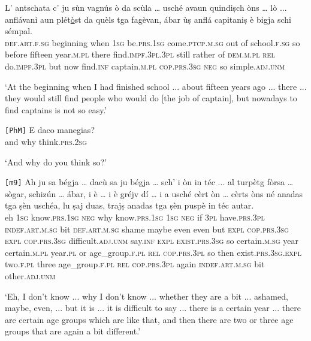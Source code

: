 \begin{linenumbers}
	\gll L’ antschata c’ ju sùn vagnús ò da scùla … usché avaun quindiṣch òns … lò ... anflávani aun plét\underline{ò}st da quèls tga fagèvan, ábar ùṣ anflá capitaniṣ è bigja schi sémpal.   \\
\textsc{def.art.f.sg} beginning when \textsc{1sg} be.\textsc{prs.1sg} come.\textsc{ptcp.m.sg} out of school.\textsc{f.sg} {} so before fifteen year.\textsc{m.pl} {} there {} find.\textsc{impf.3pl.3pl} still rather of \textsc{dem.m.pl} \textsc{rel} do.\textsc{impf.3pl} but now find.\textsc{inf} captain.\textsc{m.pl} \textsc{cop.prs.3sg} \textsc{neg} so simple.\textsc{adj.unm}\\
\end{linenumbers}
\medskip
\glt `At the beginning when I had finished school ... about fifteen years ago ... there ... they would still find people who would do [the job of captain], but nowadays to find captains is not so easy.'
\medskip

\begin{linenumbers}
	\gll  \texttt{[PhM]} E daco manegias?\\
	{} and why think.\textsc{prs.2sg}\\
\end{linenumbers}
\medskip
\glt `And why do you think so?'

\begin{linenumbers}
	\gll \texttt{[m9]} Ah ju sa bégja … dacù sa ju bégja … sch’ i òn in téc ... al turpètg fòrsa … sògar, schizún\footnotemark{} … ábar, i è … i è gréjv dí … i a usché cèrt òn … cèrts òns né anadas tga ṣèn uschéa, lu ṣaj duas, trajṣ anadas tga ṣèn puspè in téc autar.\\
{} eh \textsc{1sg} know.\textsc{prs.1sg} \textsc{neg} {} why know.\textsc{prs.1sg} \textsc{1sg} \textsc{neg} {} if \textsc{3pl} have.\textsc{prs.3pl} \textsc{indef.art.m.sg} bit {} \textsc{def.art.m.sg} shame maybe {} even even {} but \textsc{expl} \textsc{cop.prs.3sg} {} \textsc{expl} \textsc{cop.prs.3sg} difficult.\textsc{adj.unm} say.\textsc{inf} {} \textsc{expl} \textsc{exist.prs.3sg} so certain.\textsc{m.sg} year {} certain.\textsc{m.pl} year.\textsc{pl} or age\_group.\textsc{f.pl} \textsc{rel} \textsc{cop.prs.3pl} so then exist.\textsc{prs.3sg.expl} two.\textsc{f.pl} three age\_group.\textsc{f.pl} \textsc{rel} \textsc{cop.prs.3pl} again \textsc{indef.art.m.sg} bit other.\textsc{adj.unm}\\
\end{linenumbers}
\medskip
\glt `Eh, I don't know ... why I don't know ... whether they are a bit ... ashamed, maybe, even, ... but it is ... it is difficult to say ... there is a certain year ... there are certain age groups which are like that, and then there are two or three age groups that are again a bit different.'
\medskip

